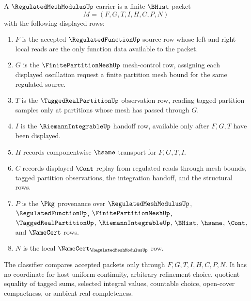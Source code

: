 \begin{definition}
\label{def:regulated-mesh-modulus-carrier}
A $\RegulatedMeshModulusUp$ carrier is a finite $\BHist$ packet
$$
M=(F,G,T,I,H,C,P,N)
$$
with the following displayed rows:
\begin{enumerate}
\item $F$ is the accepted $\RegulatedFunctionUp$ source row whose left and right local reads are the only function data available to the packet.
\item $G$ is the $\FinitePartitionMeshUp$ mesh-control row, assigning each displayed oscillation request a finite partition mesh bound for the same regulated source.
\item $T$ is the $\TaggedRealPartitionUp$ observation row, reading tagged partition samples only at partitions whose mesh has passed through $G$.
\item $I$ is the $\RiemannIntegrableUp$ handoff row, available only after $F,G,T$ have been displayed.
\item $H$ records componentwise $\hsame$ transport for $F,G,T,I$.
\item $C$ records displayed $\Cont$ replay from regulated reads through mesh bounds, tagged partition observations, the integration handoff, and the structural rows.
\item $P$ is the $\Pkg$ provenance over $\RegulatedMeshModulusUp$, $\RegulatedFunctionUp$, $\FinitePartitionMeshUp$, $\TaggedRealPartitionUp$, $\RiemannIntegrableUp$, $\BHist$, $\hsame$, $\Cont$, and $\NameCert$ rows.
\item $N$ is the local $\NameCert_{\RegulatedMeshModulusUp}$ row.
\end{enumerate}
The classifier compares accepted packets only through $F,G,T,I,H,C,P,N$. It has no coordinate for host uniform continuity, arbitrary refinement choice, quotient equality of tagged sums, selected integral values, countable choice, open-cover compactness, or ambient real completeness.
\end{definition}

